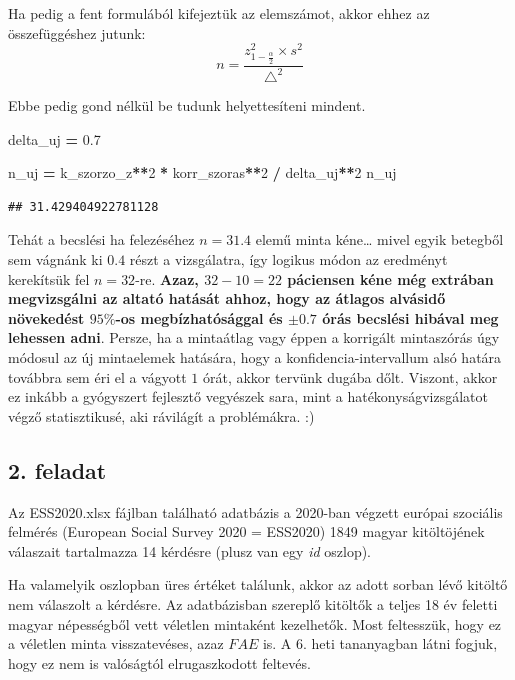 \documentclass[
]{book}
\newenvironment{Shaded}{\begin{snugshade}}{\end{snugshade}}
\newcommand{\DecValTok}[1]{\textcolor[rgb]{0.00,0.00,0.81}{#1}}
\newcommand{\FloatTok}[1]{\textcolor[rgb]{0.00,0.00,0.81}{#1}}
\newcommand{\NormalTok}[1]{#1}
\newcommand{\OperatorTok}[1]{\textcolor[rgb]{0.81,0.36,0.00}{\textbf{#1}}}
\begin{document}
Ha pedig a fent formulából kifejeztük az elemszámot, akkor ehhez az összefüggéshez jutunk: \[n=\frac{z_{1-\frac{\alpha}{2}}^2 \times s^2}{\triangle^2}\]

Ebbe pedig gond nélkül be tudunk helyettesíteni mindent.

\begin{Shaded}
\begin{Highlighting}[]
\NormalTok{delta\_uj }\OperatorTok{=} \FloatTok{0.7}

\NormalTok{n\_uj }\OperatorTok{=}\NormalTok{ k\_szorzo\_z}\OperatorTok{**}\DecValTok{2} \OperatorTok{*}\NormalTok{ korr\_szoras}\OperatorTok{**}\DecValTok{2} \OperatorTok{/}\NormalTok{ delta\_uj}\OperatorTok{**}\DecValTok{2}
\NormalTok{n\_uj}
\end{Highlighting}
\end{Shaded}

\begin{verbatim}
## 31.429404922781128
\end{verbatim}

Tehát a becslési ha felezéséhez \(n=31.4\) elemű minta kéne\ldots{} mivel egyik betegből sem vágnánk ki \(0.4\) részt a vizsgálatra, így logikus módon az eredményt kerekítsük fel \(n=32\)-re. \textbf{Azaz, \(32-10=22\) páciensen kéne még extrában megvizsgálni az altató hatását ahhoz, hogy az átlagos alvásidő növekedést \(95\%\)-os megbízhatósággal és \(\pm0.7\) órás becslési hibával meg lehessen adni}.
Persze, ha a mintaátlag vagy éppen a korrigált mintaszórás úgy módosul az új mintaelemek hatására, hogy a konfidencia-intervallum alsó határa továbbra sem éri el a vágyott \(1\) órát, akkor tervünk dugába dőlt. Viszont, akkor ez inkább a gyógyszert fejlesztő vegyészek sara, mint a hatékonyságvizsgálatot végző statisztikusé, aki rávilágít a problémákra. :)

\subsection*{2. feladat}\label{feladat-10}

Az ESS2020.xlsx fájlban található adatbázis a 2020-ban végzett európai szociális felmérés (European Social Survey 2020 = ESS2020) 1849 magyar kitöltöjének válaszait tartalmazza 14 kérdésre (plusz van egy \emph{id} oszlop).

Ha valamelyik oszlopban üres értéket találunk, akkor az adott sorban lévő kitöltő nem válaszolt a kérdésre. Az adatbázisban szereplő kitöltők a teljes 18 év feletti magyar népességből vett véletlen mintaként kezelhetők. Most feltesszük, hogy ez a véletlen minta visszatevéses, azaz \(FAE\) is. A 6. heti tananyagban látni fogjuk, hogy ez nem is valóságtól elrugaszkodott feltevés.
\end{document}
